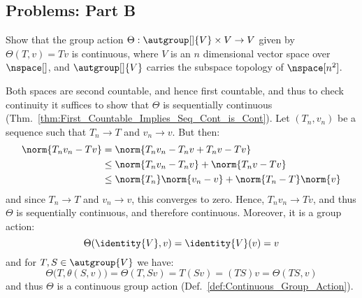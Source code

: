 \documentclass{article}                                                        %
\begin{document}
        \subsection{Problems: Part B}
            \begin{problem}
                Show that the group action
                $\Theta:\autgroup[]{V}\times{V}\rightarrow{V}$ given by
                $\Theta(T,v)=Tv$ is continuous, where $V$ is an $n$ dimensional
                vector space over $\nspace[]$, and $\autgroup[]{V}$ carries the
                subspace topology of $\nspace[n^{2}]$.
            \end{problem}
            \begin{solution}
                Both spaces are second countable, and hence first countable, and
                thus to check continuity it suffices to show that $\Theta$ is
                sequentially continuous
                (Thm.~\ref{thm:First_Countable_Implies_Seq_Cont_is_Cont}).
                Let $(T_{n},v_{n})$ be a sequence such that
                $T_{n}\rightarrow{T}$ and $v_{n}\rightarrow{v}$. But then:
                \begin{subequations}
                    \begin{align}
                        \norm{T_{n}v_{n}-Tv}&=\norm{T_{n}v_{n}-T_{n}v+T_{n}v-Tv}\\
                        &\leq\norm{T_{n}v_{n}-T_{n}v}+\norm{T_{n}v-Tv}\\
                        &\leq\norm{T_{n}}\norm{v_{n}-v}+\norm{T_{n}-T}\norm{v}
                    \end{align}
                \end{subequations}
                and since $T_{n}\rightarrow{T}$ and $v_{n}\rightarrow{v}$, this
                converges to zero. Hence, $T_{n}v_{n}\rightarrow{T}v$, and thus
                $\Theta$ is sequentially continuous, and therefore continuous.
                Moreover, it is a group action:
                \begin{equation}
                    \Theta(\identity{V},v)=\identity{V}(v)=v
                \end{equation}
                and for $T,S\in\autgroup{V}$ we have:
                \begin{equation}
                    \Theta\big(T,\theta(S,v)\big)=\Theta(T,Sv)
                    =T(Sv)=(TS)v=\Theta(TS,v)
                \end{equation}
                and thus $\Theta$ is a continuous group action
                (Def.~\ref{def:Continuous_Group_Action}).
            \end{solution}
\end{document}
